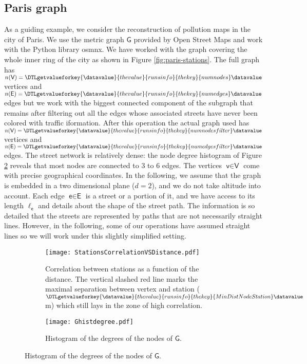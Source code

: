\documentclass[11pt,a4paper,twoside]{article}
\newcommand{\perplexityinsert}[1]{\DTLgetvalueforkey{\datavalue}{thevalue}{runsinfo}{thekey}{#1}\datavalue}
\theoremstyle{definition}
\numberwithin{equation}{section}
\newcommand{\G}{\ensuremath{\textsf{G}}} %
\newcommand{\E}{\ensuremath{\textsf{E}}} %
\newcommand{\V}{\ensuremath{\textsf{V}}} %
\newcommand{\vv}{\ensuremath{\textsf{v}}}
\newcommand{\ee}{\ensuremath{\textsf{e}}}
\newcommand{\<}{\langle}
\renewcommand{\>}{\rangle}
\begin{document}
\subsection{Paris graph}
\label{sec:paris-graph}

As a guiding example, we consider the reconstruction of pollution maps in the city of Paris. We use the metric graph $\G$ provided by Open Street Maps and work with the Python library osmnx. We have worked with the graph covering the whole inner ring of the city as shown in Figure \ref{fig:paris-stations}. The full graph has $n(\V)=\perplexityinsert{numnodes}$ vertices and $n(\E)=\perplexityinsert{numedges}$ edges but we work with the biggest connected component of the subgraph that remains after filtering out all the edges whose associated streets have never been colored with traffic iformation. After this operation the actual graph used has $n(\V)=\perplexityinsert{numnodesfilter}$ vertices and $n(\E)=\perplexityinsert{numedgesfilter}$ edges. The street network is relatively dense: the node degree histogram of Figure \ref{fig:degree-histogram} reveals that most nodes are connected to 3 to 6 edges. The vertices $\vv \in \V$ come with precise geographical coordinates. In the following, we assume that the graph is embedded in a two dimensional plane ($d=2$), and we do not take altitude into account. Each edge $\ee\in \E$ is a street or a portion of it, and we have access to its length $\ell_\ee$ and details about the shape of the street path. The information is so detailed that the streets are represented by paths that are not necessarily straight lines. However, in the following, some of our operations have assumed straight lines so we will work under this slightly simplified setting.

\begin{figure}
      \centering
      \begin{subfigure}[b]{0.48\textwidth}
          \centering
          \texttt{[image: StationsCorrelationVSDistance.pdf]}
          \caption{Correlation between stations as a function of the distance. The vertical slashed red line marks the maximal separation between vertex and station ($\perplexityinsert{MinDistNodeStation}$m) which still lays in the zone of high correlation.}
          \label{fig:correlation}
      \end{subfigure}
      \hfill
      \begin{subfigure}[b]{0.48\textwidth}
          \centering
			\texttt{[image: Ghistdegree.pdf]}
			\caption{Histogram of the degrees of the nodes of $\G$.}
          \label{fig:degree-histogram}
      \end{subfigure}
      \label{fig:stations-nodes}
 \end{figure}
\end{document}
